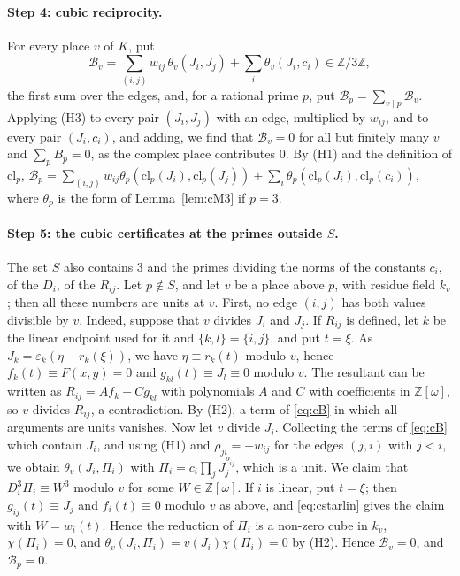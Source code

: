 \documentclass[11pt]{article}
\newcommand{\Z}{\mathbb{Z}}
\begin{document}
\paragraph{Step 4: cubic reciprocity.} For every place $v$ of $K$, put
\begin{equation}\label{eq:cB}
\mathcal B_v=\sum_{(i,j)}w_{ij}\,\theta_v(J_i,J_j)+\sum_i\theta_v(J_i,c_i)\in\Z/3\Z,
\end{equation}
the first sum over the edges, and, for a rational prime $p$, put $\mathcal B_p=\sum_{v\mid p}\mathcal B_v$. Applying (H3) to every pair $(J_i,J_j)$ with an edge, multiplied by $w_{ij}$, and to every pair $(J_i,c_i)$, and adding, we find that $\mathcal B_v=0$ for all but finitely many $v$ and $\sum_pB_p=0$, as the complex place contributes $0$. By (H1) and the definition of $\mathrm{cl}_p$, $\mathcal B_p=\sum_{(i,j)}w_{ij}\theta_p(\mathrm{cl}_p(J_i),\mathrm{cl}_p(J_j))+\sum_i\theta_p(\mathrm{cl}_p(J_i),\mathrm{cl}_p(c_i))$, where $\theta_p$ is the form of Lemma~\ref{lem:cM3} if $p=3$.

\paragraph{Step 5: the cubic certificates at the primes outside $S$.} The set $S$ also contains $3$ and the primes dividing the norms of the constants $c_i$, of the $D_i$, of the $R_{ij}$. Let $p\notin S$, and let $v$ be a place above $p$, with residue field $k_v$; then all these numbers are units at $v$. First, no edge $(i,j)$ has both values divisible by $v$. Indeed, suppose that $v$ divides $J_i$ and $J_j$. If $R_{ij}$ is defined, let $k$ be the linear endpoint used for it and $\{k,l\}=\{i,j\}$, and put $t=\xi$. As $J_k=\varepsilon_k(\eta-r_k(\xi))$, we have $\eta\equiv r_k(t)$ modulo $v$, hence $f_k(t)\equiv F(x,y)=0$ and $g_{kl}(t)\equiv J_l\equiv0$ modulo $v$. The resultant can be written as $R_{ij}=Af_k+Cg_{kl}$ with polynomials $A$ and $C$ with coefficients in $\Z[\omega]$, so $v$ divides $R_{ij}$, a contradiction. By (H2), a term of \eqref{eq:cB} in which all arguments are units vanishes. Now let $v$ divide $J_i$. Collecting the terms of \eqref{eq:cB} which contain $J_i$, and using (H1) and $\rho_{ji}=-w_{ij}$ for the edges $(j,i)$ with $j<i$, we obtain $\theta_v(J_i,\Pi_i)$ with $\Pi_i=c_i\prod_jJ_j^{\rho_{ij}}$, which is a unit. We claim that $D_i^3\Pi_i\equiv W^3$ modulo $v$ for some $W\in\Z[\omega]$. If $i$ is linear, put $t=\xi$; then $g_{ij}(t)\equiv J_j$ and $f_i(t)\equiv0$ modulo $v$ as above, and \eqref{eq:cstarlin} gives the claim with $W=w_i(t)$. Hence the reduction of $\Pi_i$ is a non-zero cube in $k_v$, $\chi(\Pi_i)=0$, and $\theta_v(J_i,\Pi_i)=v(J_i)\chi(\Pi_i)=0$ by (H2). Hence $\mathcal B_v=0$, and $\mathcal B_p=0$.
\end{document}
